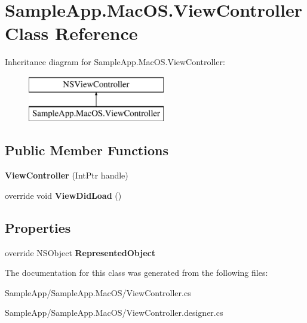 \hypertarget{class_sample_app_1_1_mac_o_s_1_1_view_controller}{}\section{Sample\+App.\+Mac\+O\+S.\+View\+Controller Class Reference}
\label{class_sample_app_1_1_mac_o_s_1_1_view_controller}
Inheritance diagram for Sample\+App.\+Mac\+O\+S.\+View\+Controller\+:\begin{figure}[H]
\begin{center}
\leavevmode
\includegraphics[height=2.000000cm]{class_sample_app_1_1_mac_o_s_1_1_view_controller}
\end{center}
\end{figure}
\subsection*{Public Member Functions}
\begin{DoxyCompactItemize}
\item 
\mbox{\label{class_sample_app_1_1_mac_o_s_1_1_view_controller_a039d1da4d44ce32808c64d2bb5a436f9}} 
{\bfseries View\+Controller} (Int\+Ptr handle)
\item 
\mbox{\label{class_sample_app_1_1_mac_o_s_1_1_view_controller_a833e406288d7d4f6f57bbe3e13a21c9e}} 
override void {\bfseries View\+Did\+Load} ()
\end{DoxyCompactItemize}
\subsection*{Properties}
\begin{DoxyCompactItemize}
\item 
\mbox{\label{class_sample_app_1_1_mac_o_s_1_1_view_controller_a9e8a562fc2272c30198181a448e538a1}} 
override N\+S\+Object {\bfseries Represented\+Object}
\end{DoxyCompactItemize}


The documentation for this class was generated from the following files\+:\begin{DoxyCompactItemize}
\item 
Sample\+App/\+Sample\+App.\+Mac\+O\+S/View\+Controller.\+cs\item 
Sample\+App/\+Sample\+App.\+Mac\+O\+S/View\+Controller.\+designer.\+cs\end{DoxyCompactItemize}
